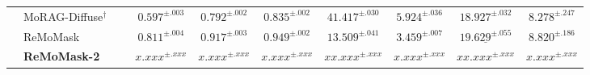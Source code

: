 \documentclass[10pt,journal,compsoc]{IEEEtran}
\begin{document}
\begin{table}[t]
{\begin{tabular}{l|l| c | c c c| c |c| c| c}
        & MoRAG-Diffuse$^{\dag}$~\cite{morag} & &$0.597^{\pm.003}$& $0.792^{\pm.002}$& $0.835^{\pm.002}$ & $41.417^{\pm.030}$ & $5.924^{\pm.036}$ & $18.927^{\pm.032}$ & $8.278^{\pm{.247}}$\\
        \rowcolor[gray]{0.90} \cellcolor{white}  & ReMoMask & & $\mathbf{0.811^{\pm.004}}$& $\mathbf{0.917^{\pm.003}}$& $\mathbf{0.949^{\pm.002}}$ & $\mathbf{13.509^{\pm.041}}$&$\mathbf{3.459^{\pm{.007}}}$ & $\underline{19.629^{\pm.055}}$ & $8.820^{\pm.186}$ \\
        \rowcolor{yellow!20} \cellcolor{white}  & \textbf{ReMoMask-2} & & $x.xxx^{\pm.xxx}$& $x.xxx^{\pm.xxx}$& $x.xxx^{\pm.xxx}$ & $xx.xxx^{\pm.xxx}$&$x.xxx^{\pm.xxx}$ & $xx.xxx^{\pm.xxx}$ & $x.xxx^{\pm.xxx}$ \\
        \bottomrule
    \end{tabular}}
    \vspace{-1em}
\end{table}


% 
\begin{table}[t]
    \centering
    \caption{Ablation study on HumanML3D dataset.}
    \label{tab:ablation_ssta}
    \begin{minipage}{\columnwidth}
    \renewcommand{\arraystretch}{1.1}  %
    \end{minipage}
\end{table}
\end{document}
